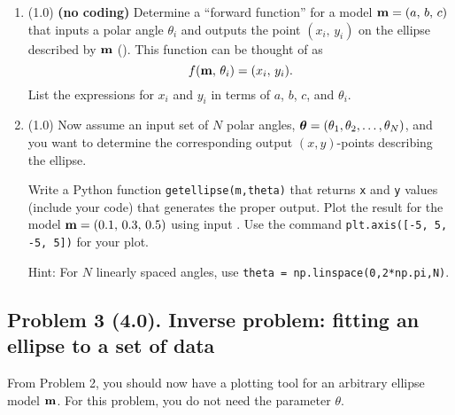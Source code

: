 \documentclass[11pt,titlepage,fleqn]{article}
\begin{document}
\begin{enumerate}
\item (1.0) {\bf (no coding)} Determine a ``forward function'' for a model $\mbox{${\bf m}$} = (a,\,b,\,c)$ that inputs a polar angle $\theta_i$ and outputs the point $(x_i,\,y_i)$ on the ellipse described by $\mbox{${\bf m}$}$ (). This function can be thought of as
%
\begin{equation}
f(\mbox{${\bf m}$},\,\theta_i) = (x_i,\,y_i).
\end{equation}
%
List the expressions for $x_i$ and $y_i$ in terms of $a$, $b$, $c$, and $\theta_i$.

\item (1.0) Now assume an input set of $N$ polar angles, $\mbox{\boldmath $\bf \theta$} = (\theta_1, \theta_2, \ldots, \theta_N)$, and you want to determine the corresponding output $(x,y)$-points describing the ellipse.

Write a Python function \verb+getellipse(m,theta)+ that returns \verb+x+ and \verb+y+ values (include your code) that generates the proper output. Plot the result for the model $\mbox{${\bf m}$} = (0.1,\,0.3,\,0.5)$ using input . Use the command \verb+plt.axis([-5, 5, -5, 5])+ for your plot.

Hint: For $N$ linearly spaced angles, use \verb+theta = np.linspace(0,2*np.pi,N)+.

\end{enumerate}


\pagebreak
\subsection*{Problem 3 (4.0). Inverse problem: fitting an ellipse to a set of data}

From Problem 2, you should now have a plotting tool for an arbitrary ellipse model $\mbox{${\bf m}$}$.
For this problem, you do not need the parameter $\theta$.
\end{document}
